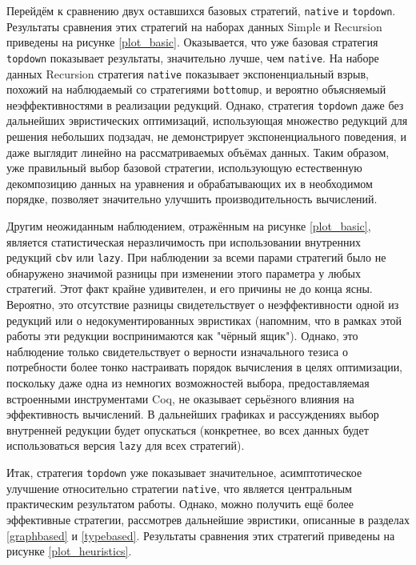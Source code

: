 \documentclass[../diploma.tex]{subfiles}
\begin{document}
Перейдём к сравнению двух оставшихся базовых стратегий, \texttt{native} и \texttt{topdown}. Результаты сравнения этих стратегий на наборах данных Simple и Recursion приведены на рисунке \ref{plot_basic}. Оказывается, что уже базовая стратегия \texttt{topdown} показывает результаты, значительно лучше, чем \texttt{native}. На наборе данных Recursion стратегия \texttt{native} показывает экспоненциальный взрыв, похожий на наблюдаемый со стратегиями \texttt{bottomup}, и вероятно объясняемый неэффективностями в реализации редукций. Однако, стратегия \texttt{topdown} даже без дальнейших эвристических оптимизаций, использующая множество редукций для решения небольших подзадач, не демонстрирует экспоненциального поведения, и даже выглядит линейно на рассматриваемых объёмах данных. Таким образом, уже правильный выбор базовой стратегии, использующую естественную декомпозицию данных на уравнения и обрабатывающих их в необходимом порядке, позволяет значительно улучшить производительность вычислений.

Другим неожиданным наблюдением, отражённым на рисунке \ref{plot_basic}, является статистическая неразличимость при использовании внутренних редукций \texttt{cbv} или \texttt{lazy}. При наблюдении за всеми парами стратегий было не обнаружено значимой разницы при изменении этого параметра у любых стратегий. Этот факт крайне удивителен, и его причины не до конца ясны. Вероятно, это отсутствие разницы свидетельствует о неэффективности одной из редукций или о недокументированных эвристиках (напомним, что в рамках этой работы эти редукции воспринимаются как "чёрный ящик"). Однако, это наблюдение только свидетельствует о верности изначального тезиса о потребности более тонко настраивать порядок вычисления в целях оптимизации, поскольку даже одна из немногих возможностей выбора, предоставляемая встроенными инструментами Coq, не оказывает серьёзного влияния на эффективность вычислений. В дальнейших графиках и рассуждениях выбор внутренней редукции будет опускаться (конкретнее, во всех данных будет использоваться версия \texttt{lazy} для всех стратегий).

Итак, стратегия \texttt{topdown} уже показывает значительное, асимптотическое улучшение относительно стратегии \texttt{native}, что является центральным практическим результатом работы. Однако, можно получить ещё более эффективные стратегии, рассмотрев дальнейшие эвристики, описанные в разделах \ref{graphbased} и \ref{typebased}. Результаты сравнения этих стратегий приведены на рисунке \ref{plot_heuristics}.
\end{document}
